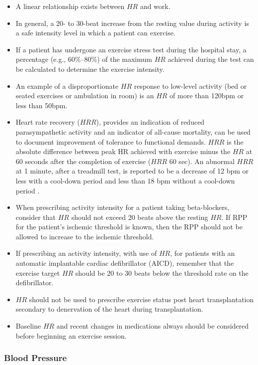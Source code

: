 \begin{itemize}
\item A linear relationship exists between $HR$ and work.
\item In general, a 20- to 30-beat increase from the resting value during activity is a safe intensity level in which a patient can exercise.
\item If a patient has undergone an exercise stress test during the hospital stay, a percentage (e.g., 60\%–80\%) of the maximum $HR$ achieved during the test can be calculated to determine the exercise intensity.
\item An example of a disproportionate $HR$ response to low-level activity (bed or seated exercises or ambulation in room) is an $HR$ of more than 120bpm or less than 50bpm.
\item Heart rate recovery ($HRR$), provides an indication of reduced parasympathetic activity and an indicator of all-cause mortality, can be used to document improvement of tolerance to functional demands. $HRR$ is the absolute difference between peak HR achieved with exercise minus the $HR$ at 60 seconds after the completion of exercise ($HRR$ 60 sec).  An abnormal $HRR$ at 1 minute, after a treadmill test, is reported to be a decrease of 12 bpm or less with a cool-down period and less than 18 bpm without a cool-down period \cite{collins_cardiac_2019}.
\item When prescribing activity intensity for a patient taking beta-blockers, consider that $HR$ should not exceed 20 beats above the resting $HR$. If RPP for the patient's ischemic threshold is known, then the RPP should not be allowed to increase to the ischemic threshold.
\item If prescribing an activity intensity, with use of $HR$, for patients with an automatic implantable cardiac defibrillator (AICD), remember that the exercise target $HR$ should be 20 to 30 beats below the threshold rate on the defibrillator.
\item $HR$ should not be used to prescribe exercise status post heart transplantation secondary to denervation of the heart during transplantation.
\item Baseline $HR$ and recent changes in medications always should be considered before beginning an exercise session.
\end{itemize}

\subsubsection{Blood Pressure}

